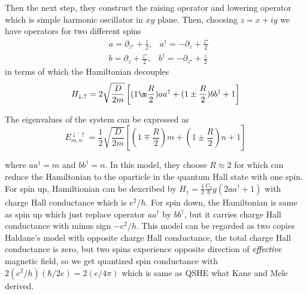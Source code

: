 \documentclass[12pt,a4paper]{article}
\begin{document}
Then the next step, they construct the raising operator and lowering
operator which is simple harmonic oscillator in $xy$ plane. Then, choosing
$z = x + iy$ we have operators for two different spins
\begin{eqnarray*}
& a = \partial_{z^\star} + \frac{z}{2}, \;\;\; a^\dagger = - \partial_z + \frac{z^\star}{2} \nonumber \\
& b = \partial_{z} + \frac{z^\star}{2}, \;\;\; b^\dagger = -
\partial_{z^\star} + \frac{z}{2}
\end{eqnarray*}
\noindent in terms of which the Hamiltonian decouples
\begin{equation*}
H_{\downarrow, \uparrow} =2 \sqrt{\frac{D}{2m}} \left[(1 \m\frac{R}{2} ) a a^\dagger + (1 \pm \frac{R}{2}) b b^\dagger  + 1 \right]
\end{equation*}

\noindent
The eigenvalues of the system can be expressed as 
\begin{equation*}
E^{\downarrow, \uparrow}_{m,n} = \frac{1}{2} \sqrt{\frac{D}{2m}}
\left[(1 \mp \frac{R}{2} ) m + (1 \pm \frac{R}{2}) n + 1 \right] 
\end{equation*}

\noindent
where $aa^\dagger = m$ and $bb^\dagger = n$. In this model, they choose $R
\approx 2$ for which can reduce the Hamiltonian to the oparticle in the
quantum Hall state with one spin. For spin up, Hamiltionian can be
dexcribed by $H_{\uparrow} = \frac{1}{2} \frac{C_3}{\hbar} g 
(2 a a^\dagger + 1) $ with charge Hall conductance which is $e^2/h$. 
For spin down, the Hamiltonian is same as spin up which just replace 
operator $aa^\dagger$ by $bb^\dagger$, but it carries charge Hall 
conductance with minus sign $-e^2/h$. This model can be regarded as two
copies Haldane's model with opposite charge Hall conductance, the total
charge Hall conductance is zero, but two spins experience opposite
direction of $\it effective$ magnetic field, so we get quantized spin
conductance with $2 (e^2/h) (\hbar/2e)= 2(e/4\pi)$ 
which is same as QSHE what Kane and Mele derived.\\ 
\end{document}
